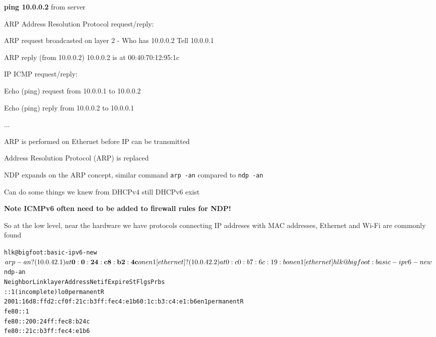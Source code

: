 \documentclass[Screen16to9,17pt]{foils}
\begin{document}


\begin{list1}
\item {\bfseries ping 10.0.0.2} from server
\item ARP Address Resolution Protocol request/reply:
  \begin{list2}
  \item ARP request broadcasted on layer 2 - Who has 10.0.0.2 Tell 10.0.0.1
  \item ARP reply (from 10.0.0.2) 10.0.0.2 is at 00:40:70:12:95:1c
  \end{list2}
\item IP ICMP request/reply:
  \begin{list2}
    \item Echo (ping) request from 10.0.0.1 to 10.0.0.2
\item Echo (ping) reply from 10.0.0.2 to 10.0.0.1
\item ...
  \end{list2}
\item ARP is performed on Ethernet before IP can be transmitted
\end{list1}




\begin{list1}
\item Address Resolution Protocol (ARP) is replaced
\item NDP expands on the ARP concept, similar command \verb+arp -an+ compared to \verb+ndp -an+
\item Can do some things we knew from DHCPv4 still DHCPv6 exist
\item {\bf Note ICMPv6 often need to be added to firewall rules for NDP!} {\myalert}
\end{list1}


So at the low level, near the hardware we have protocols connecting IP addreses with MAC addresses, Ethernet and Wi-Fi are commonly found

\begin{alltt}
\small
hlk@bigfoot:basic-ipv6-new$ arp -an
? (10.0.42.1) at{\bf 0:0:24:c8:b2:4c} on en1 [ethernet]
? (10.0.42.2) at 0:c0:b7:6c:19:b on en1 [ethernet]

hlk@bigfoot:basic-ipv6-new$ ndp -an
Neighbor                      Linklayer Address  Netif Expire    St Flgs Prbs
::1                           (incomplete)         lo0 permanent R
2001:16d8:ffd2:cf0f:21c:b3ff:fec4:e1b6 0:1c:b3:c4:e1:b6 en1 permanent R
fe80::1%
fe80::200:24ff:fec8:b24c%
fe80::21c:b3ff:fec4:e1b6%
\end{alltt}
\end{document}

